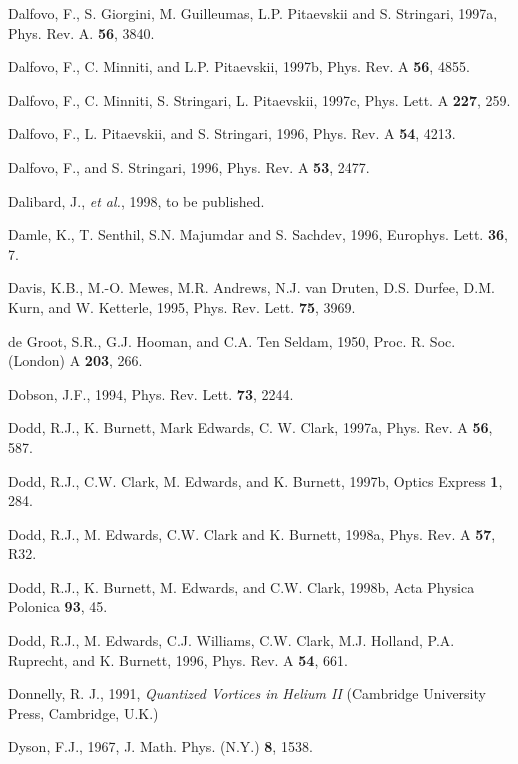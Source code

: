 \begin{references}
 Dalfovo, F., S. Giorgini, M. Guilleumas, L.P.
Pitaevskii and S. Stringari, 1997a, Phys. Rev. A. {\bf 56}, 3840.

 Dalfovo, F., C. Minniti, and L.P. Pitaevskii,
1997b, Phys. Rev. A {\bf 56}, 4855. 

 Dalfovo, F., C. Minniti, S. Stringari, L.
Pitaevskii, 1997c, Phys. Lett. A {\bf 227}, 259.

 Dalfovo, F., L. Pitaevskii, and S. Stringari, 
1996, Phys. Rev. A {\bf 54}, 4213.  

 Dalfovo, F., and S. Stringari, 1996, Phys. Rev. A
{\bf 53}, 2477. 

   Dalibard, J., {\it et al.}, 1998, to be published.

    Damle, K., T. Senthil, S.N. Majumdar and S.
Sachdev, 1996, Europhys.  Lett. {\bf 36}, 7.

    Davis, K.B., M.-O. Mewes, M.R. Andrews,  N.J. van
Druten, D.S. Durfee,  D.M. Kurn, and W. Ketterle, 1995, Phys. Rev. Lett.
{\bf 75}, 3969. 

  de Groot, S.R., G.J. Hooman, and C.A. Ten Seldam,
1950, Proc. R. Soc. (London) A {\bf 203}, 266.

   Dobson, J.F., 1994, Phys. Rev. Lett. {\bf 73}, 2244.

    Dodd, R.J., K. Burnett, Mark Edwards, C. W. Clark,
1997a, Phys. Rev. A {\bf 56}, 587.

    Dodd, R.J., C.W. Clark, M. Edwards, and K. Burnett,
1997b, Optics Express {\bf 1}, 284. 

    Dodd, R.J., M. Edwards, C.W. Clark and K. Burnett,
1998a, Phys. Rev. A {\bf 57}, R32.

   Dodd, R.J., K. Burnett, M. Edwards, and C.W. Clark,
1998b, Acta Physica Polonica {\bf 93}, 45. 

     Dodd, R.J., M. Edwards, C.J. Williams, C.W. Clark,
M.J. Holland, P.A. Ruprecht, and K. Burnett, 1996,  Phys. Rev. A {\bf 54},
661.

 Donnelly, R. J., 1991, {\it Quantized Vortices in
Helium II} (Cambridge University  Press, Cambridge, U.K.)

  Dyson, F.J., 1967, J. Math. Phys. (N.Y.) {\bf 8}, 1538.


\end{references}
